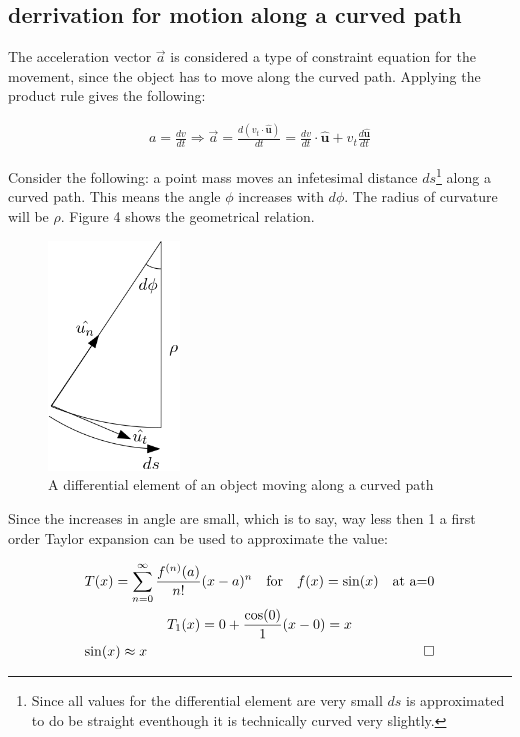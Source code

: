 \documentclass[11pt, a4paper]{article}
\newcommand*{\qed}{\hfill\ensuremath{\quad\square}}%
\begin{document}
\subsection{derrivation for motion along a curved path}
The acceleration vector $\vec{a}$ is considered a type of constraint equation for the movement, 
since the object has to move along the curved path. Applying the product rule gives the following:

\begin{gather}
    a = \frac{dv}{dt} \Rightarrow \vec{a} = \frac{d(v_t \cdot \boldsymbol{\hat{u}})}{dt} = \frac{dv}{dt} \cdot 
        \boldsymbol{\hat{u}} + v_t \frac{d\boldsymbol{\hat{u}}}{dt}
\end{gather}

Consider the following: a point mass moves an infetesimal distance $ds$\footnote{Since all values for the differential element are very small
$ds$ is approximated to do be straight eventhough it is technically curved very slightly.} along a curved path.
This means the angle $\phi$ increases with $d\phi$. The radius of curvature will be $\rho$. Figure 4 shows the geometrical relation.
\begin{figure}[h]
    \centerline{\includegraphics[width=3.5cm]{images/Differential_element.png}}
    \caption{A differential element of an object moving along a curved path}
\end{figure}
Since the increases in angle are small,
which is to say, way less then 1 a first order Taylor expansion can be used to approximate the value:

\begin{gather}
    T(x) = \sum_{n=0}^{\infty} \frac{f^{(n)}(a)}{n!} (x-a)^n \quad\text{for}\quad f(x) = \sin(x) \quad \text{at a=0}\\
    T_1(x) = 0 + \frac{\cos(0)}{1} (x-0) = x\\
    \sin(x) \approx x \qed
\end{gather}
\end{document}
